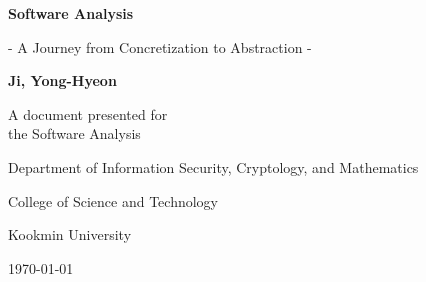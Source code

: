\begin{titlepage}
    \centering
    
    \vspace*{1cm}
    
    \Huge\textsf{\textbf{Software Analysis}}
    
    \vspace{0.5cm}
    \LARGE\textsf{- A Journey from Concretization to Abstraction -}
    
    \vspace{1.5cm}
    \textbf{Ji, Yong-Hyeon}

    \vfill
    A document presented for\\
    the Software Analysis
    
    \vspace{0.8cm}
    {\large\textsf{Department of Information Security, Cryptology, and Mathematics}\par}
    {\large\textsf{College of Science and Technology}\par}
    {\large\textsf{Kookmin University}\par}
    \vspace{.25in}
    {\large \textsf{\today}\par}
    
\end{titlepage}

